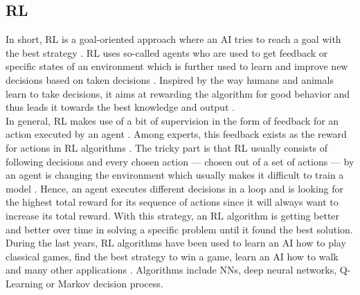 \documentclass[MGS,Master,english]{twbook}%
\begin{document}
\subsection{\acl{RL}}
In short, \ac{RL} is a goal-oriented approach where an AI tries to reach a goal with the best strategy \cite{ml::book::developer}. RL uses so-called agents who are used to get feedback or specific states of an environment which is further used to learn and improve new decisions based on taken decisions \cite{ml::book::developer}. Inspired by the way humans and animals learn to take decisions, it aims at rewarding the algorithm for good behavior and thus leads it towards the best knowledge and output \cite{ai::book}. \\
In general, RL makes use of a bit of supervision in the form of feedback for an action executed by an agent \cite{ml::book::statistics}. Among experts, this feedback exists as the reward for actions in RL algorithms \cite{ml::book::statistics}.  The tricky part is that RL usually consists of following decisions and every chosen action — chosen out of a set of actions — by an agent is changing the environment which usually makes it difficult to train a model \cite{ml::book::statistics}. Hence, an agent executes different decisions in a loop and is looking for the highest total reward for its sequence of actions since it will always want to increase its total reward. \cite{ai::book} With this strategy, an RL algorithm is getting better and better over time in solving a specific problem until it found the best solution.\\
During the last years, RL algorithms have been used to learn an AI how to play classical games, find the best strategy to win a game, learn an AI how to walk and many other applications \cite{ml::book::algorithms}. Algorithms include \acp{NN}, deep neural networks, Q-Learning or Markov decision process. \cite{ml::book::statistics}
\end{document}

